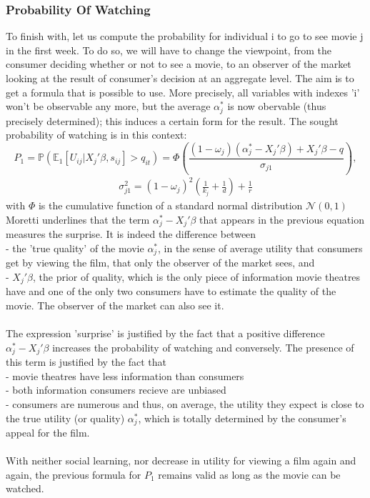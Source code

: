 \subsubsection{Probability Of Watching}
To finish with, let us compute the probability for individual i to go to see movie j in the first week. To do so, we will have to change the viewpoint, from the consumer deciding whether or not to see a movie, to an observer of the market looking at the result of consumer's decision at an aggregate level. The aim is to get a formula that is possible to use. More precisely, all variables with indexes 'i' won't be observable any more, but the average $\alpha_{j}^{*}$ is now obervable (thus precisely determined); this induces a certain form for the result. The sought probability of watching is in this context:
\begin{equation} \label{eq:4}
	P_{1}=\mathbb{P}(\mathbb{E}_1[U_{i j}|X_{j}'\beta, s_{i j}]>q_{i t})=\Phi\left(\frac{(1-\omega_{j})(\alpha_{j}^{*}-X_{j}'\beta)+X_{j}'\beta-q}{\sigma_{j 1}}\right),
\end{equation}
\begin{align*}
	\sigma_{j 1}^{2}=(1-\omega_{j})^{2}\left(\frac{1}{k_{j}}+\frac{1}{d}\right)+\frac{1}{r}
\end{align*}
with $\Phi$ is the cumulative function of a standard normal distribution $\mathcal{N}(0,1)$
Moretti underlines that the term $\alpha_{j}^{*}-X_{j}'\beta$ that appears in the previous equation measures the surprise. It is indeed the difference between\\
- the 'true quality' of the movie $\alpha_{j}^{*}$, in the sense of average utility that consumers get by viewing the film, that only the observer of the market sees, and\\
- $X_{j}'\beta$, the prior of quality, which is the only piece of information movie theatres have and one of the only two consumers have to estimate the quality of the movie. The observer of the market can also see it.\\
\\
The expression 'surprise' is justified by the fact that a positive difference $\alpha_{j}^{*}-X_{j}'\beta$ increases the probability of watching and conversely. The presence of this term is justified by the fact that\\
- movie theatres have less information than consumers\\
- both information consumers recieve are unbiased\\
- consumers are numerous and thus, on average, the utility they expect is close to the true utility (or quality) $\alpha_{j}^{*}$, which is totally determined by the consumer's appeal for the film.\\
\\
With neither social learning, nor decrease in utility for viewing a film again and again, the previous formula for $P_{1}$ remains valid as long as the movie can be watched.\\
	
